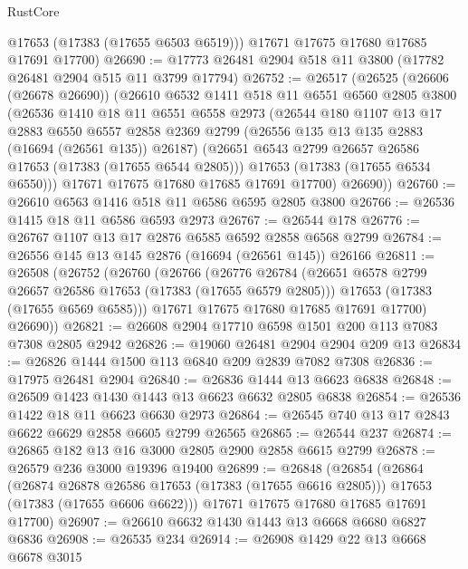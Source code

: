 \begin{lexlean}{RustCore}
\begin{coremodule}
        @17653
        (@17383 (@17655 @6503 @6519)))
      @17671
      @17675
      @17680
      @17685
      @17691
      @17700)
@26690 := @17773 @26481 @2904 @518 @11 @3800 (@17782 @26481 @2904 @515 @11 @3799 @17794)
@26752 := @26517
    (@26525
      (@26606 (@26678 @26690))
      (@26610
        @6532
        @1411
        @518
        @11
        @6551
        @6560
        @2805
        @3800
        (@26536
          @1410
          @18
          @11
          @6551
          @6558
          @2973
          (@26544
            @180
            @1107
            @13
            @17
            @2883
            @6550
            @6557
            @2858
            @2369
            @2799
            (@26556 @135 @13 @135 @2883 (@16694 (@26561 @135)) @26187)
            (@26651 @6543 @2799 @26657 @26586 @17653 (@17383 (@17655 @6544 @2805)))
            @17653
            (@17383 (@17655 @6534 @6550)))
          @17671
          @17675
          @17680
          @17685
          @17691
          @17700)
        @26690))
@26760 := @26610 @6563 @1416 @518 @11 @6586 @6595 @2805 @3800
@26766 := @26536 @1415 @18 @11 @6586 @6593 @2973
@26767 := @26544 @178
@26776 := @26767 @1107 @13 @17 @2876 @6585 @6592 @2858 @6568 @2799
@26784 := @26556 @145 @13 @145 @2876 (@16694 (@26561 @145)) @26166
@26811 := @26508
    (@26752
      (@26760
        (@26766
          (@26776
            @26784
            (@26651 @6578 @2799 @26657 @26586 @17653 (@17383 (@17655 @6579 @2805)))
            @17653
            (@17383 (@17655 @6569 @6585)))
          @17671
          @17675
          @17680
          @17685
          @17691
          @17700)
        @26690))
@26821 := @26608 @2904 @17710 @6598 @1501 @200 @113 @7083 @7308 @2805 @2942
@26826 := @19060 @26481 @2904 @2904 @209 @13
@26834 := @26826 @1444 @1500 @113 @6840 @209 @2839 @7082 @7308
@26836 := @17975 @26481 @2904
@26840 := @26836 @1444 @13 @6623 @6838
@26848 := @26509 @1423 @1430 @1443 @13 @6623 @6632 @2805 @6838
@26854 := @26536 @1422 @18 @11 @6623 @6630 @2973
@26864 := @26545 @740 @13 @17 @2843 @6622 @6629 @2858 @6605 @2799 @26565
@26865 := @26544 @237
@26874 := @26865 @182 @13 @16 @3000 @2805 @2900 @2858 @6615 @2799
@26878 := @26579 @236 @3000 @19396 @19400
@26899 := @26848
    (@26854
      (@26864
        (@26874 @26878 @26586 @17653 (@17383 (@17655 @6616 @2805)))
        @17653
        (@17383 (@17655 @6606 @6622)))
      @17671
      @17675
      @17680
      @17685
      @17691
      @17700)
@26907 := @26610 @6632 @1430 @1443 @13 @6668 @6680 @6827 @6836
@26908 := @26535 @234
@26914 := @26908 @1429 @22 @13 @6668 @6678 @3015

\end{coremodule}
\end{lexlean}

